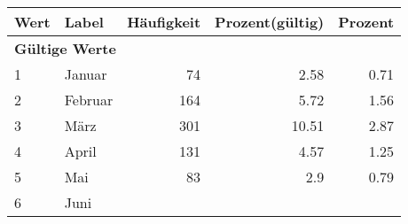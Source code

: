      \begin{longtable}{lXrrr}
     \toprule
     \textbf{Wert} & \textbf{Label} & \textbf{Häufigkeit} & \textbf{Prozent(gültig)} & \textbf{Prozent} \\
     \endhead
     \midrule
     \multicolumn{5}{l}{\textbf{Gültige Werte}}\\

     1 &
     \multicolumn{1}{X}{ Januar   } &


       \num{74} &
       \num[round-mode=places,round-precision=2]{2,58} &
         \num[round-mode=places,round-precision=2]{0,71} \\

     2 &
     \multicolumn{1}{X}{ Februar   } &


       \num{164} &
       \num[round-mode=places,round-precision=2]{5,72} &
         \num[round-mode=places,round-precision=2]{1,56} \\

     3 &
     \multicolumn{1}{X}{ März   } &


       \num{301} &
       \num[round-mode=places,round-precision=2]{10,51} &
         \num[round-mode=places,round-precision=2]{2,87} \\

     4 &
     \multicolumn{1}{X}{ April   } &


       \num{131} &
       \num[round-mode=places,round-precision=2]{4,57} &
         \num[round-mode=places,round-precision=2]{1,25} \\

     5 &
     \multicolumn{1}{X}{ Mai   } &


       \num{83} &
       \num[round-mode=places,round-precision=2]{2,9} &
         \num[round-mode=places,round-precision=2]{0,79} \\

     6 &
     \multicolumn{1}{X}{ Juni   } &



\end{longtable}
